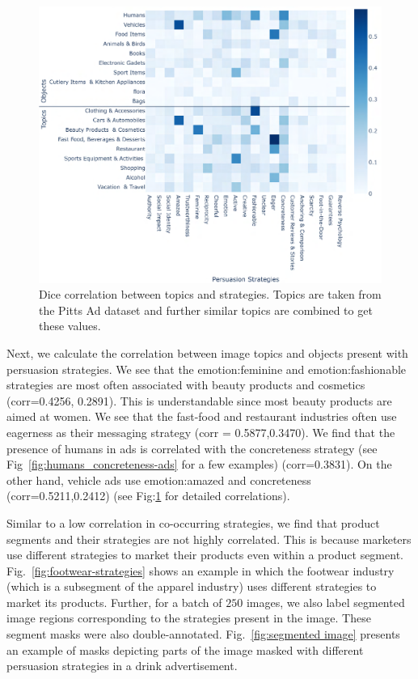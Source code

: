 \documentclass[hidelinks,11pt,a4paper]{report}
\begin{document}
\begin{figure}[h]
        \centering
        \includegraphics[scale=0.55]{images/objects_topics.pdf}
        \caption{Dice correlation between topics and strategies. Topics are taken from the Pitts Ad dataset and further similar topics are combined to get these values.}
        \label{fig:correlation-between-topics-and-strategies}
    \end{figure}

Next, we calculate the correlation between image topics and objects present with persuasion strategies. We see that the emotion:feminine and emotion:fashionable strategies are most often associated with beauty products and cosmetics (corr=0.4256, 0.2891). This is understandable since most beauty products are aimed at women. We see that the fast-food and restaurant industries often use eagerness as their messaging strategy (corr = 0.5877,0.3470). We find that the presence of humans in ads is correlated with the concreteness strategy (see Fig~\ref{fig:humans_concreteness-ads} for a few examples) (corr=0.3831). On the other hand, vehicle ads use emotion:amazed and concreteness (corr=0.5211,0.2412) (see Fig:\ref{fig:correlation-between-topics-and-strategies} for detailed correlations). 

Similar to a low correlation in co-occurring strategies, we find that product segments and their strategies are not highly correlated. This is because marketers use different strategies to market their products even within a product segment. Fig.~\ref{fig:footwear-strategies} shows an example in which the footwear industry (which is a subsegment of the apparel industry) uses different strategies to market its products. Further, for a batch of $250$ images, we also label segmented image regions corresponding to the strategies present in the image. These segment masks were also double-annotated. Fig.~\ref{fig:segmented image} presents an example of masks depicting parts of the image masked with different persuasion strategies in a drink advertisement.
\end{document}
